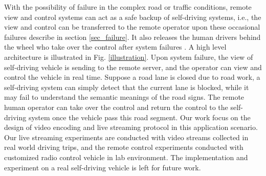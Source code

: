 With the possibility of failure in the complex road or traffic
conditions, remote view and control systems can act as a safe backup
of self-driving systems, 
i.e., the view and control can be transferred to the remote
operator upon these occasional failures describe in section \ref{sec_failure}. 
It also releases the human drivers behind the wheel who take over the 
control after system failures \cite{waymo}. 
A high level architecture is illustrated in Fig. \ref{illustration}.  
Upon system failure, the view of self-driving vehicle
is sending to the remote server, 
and the operator can view and control the vehicle in real time. 
Suppose a road lane is closed due to road work, 
a self-driving system can simply detect
that the current lane is blocked,
while it may fail to understand the semantic meanings
of the road signs. 
The remote human operator can take over the control and 
return the control to the self-driving system once the vehicle pass this road segment. 
Our work focus on the design of video encoding and live streaming protocol
in this application scenario. 
Our live streaming experiments are conducted with video streams
collected in real world driving trips, 
and the remote control experiments conducted with customized 
radio control vehicle in lab environment. 
The implementation and experiment on a real self-driving vehicle 
is left for future work. 




